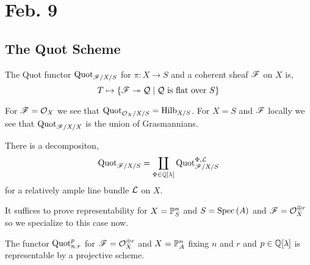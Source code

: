 \documentclass[12pt]{article}
\begin{document}
\section{Feb. 9}

\subsection{The Quot Scheme}

\newcommand{\uQuot}{\underline{\Quot}}

\begin{defn}
The Quot functor $\Quot_{\F/X/S}$ for $\pi : X \to S$ and a coherent sheaf $\F$ on $X$ is,
\[ T \mapsto \{ \F \onto \sQ \mid \sQ \text{ is flat over } S \} \]
\end{defn}

\begin{rmk}
For $\F = \struct{X}$ we see that $\Quot_{\struct{X}/X/S} = \Hilb_{X/S}$. For $X = S$ and $\F$ locally we see that $\Quot_{\F/X/X}$ is the union of Grasmannians.
\end{rmk}

\begin{rmk}
There is a decompositon,
\[ \Quot_{\F/X/S} = \coprod_{\Phi \in \Q[\lambda]} \Quot_{\F/X/S}^{\Phi, \L} \]
for a relatively ample line bundle $\L$ on $X$.
\end{rmk}

\begin{rmk}
It suffices to prove representability for $X = \P^n_S$ and $S = \Spec{A}$ and $\F = \struct{X}^{\oplus r}$ so we specialize to this case now. 
\end{rmk}

\begin{thm}
The functor $\Quot_{n.r}^{p}$ for $\F = \struct{X}^{\oplus r}$ and $X = \P^n_A$ fixing $n$ and $r$ and $p \in \Q[\lambda]$ is representable by a projective scheme.
\end{thm}
\end{document}
